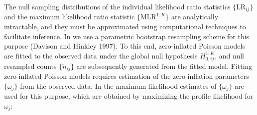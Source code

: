 The null sampling distributions of the individual likelihood ratio statistics \(\{\text{LR}_{i j}\}\) and the maximum likelihood ratio statistic \(\{\text{MLR}^{1:K}\}\) are analytically intractable, and they must be approximated using computational techniques to facilitate inference. In  we use a parametric bootstrap resampling scheme for this purpose (Davison and Hinkley 1997). To this end, zero-inflated Poisson models are fitted to the observed data under the global null hypothesis \(H_{0, ij}^{1:K}\), and null resampled counts \(\{\tilde n_{i j}\}\) are subsequently generated from the fitted model. Fitting zero-inflated Poisson models requires estimation of the zero-inflation parameters \(\{\omega_j\}\) from the observed data. In  the maximum likelihood estimates of \(\{\omega_j\}\) are used for this purpose, which are obtained by maximizing the profile likelihood for \(\omega_j\):\\

